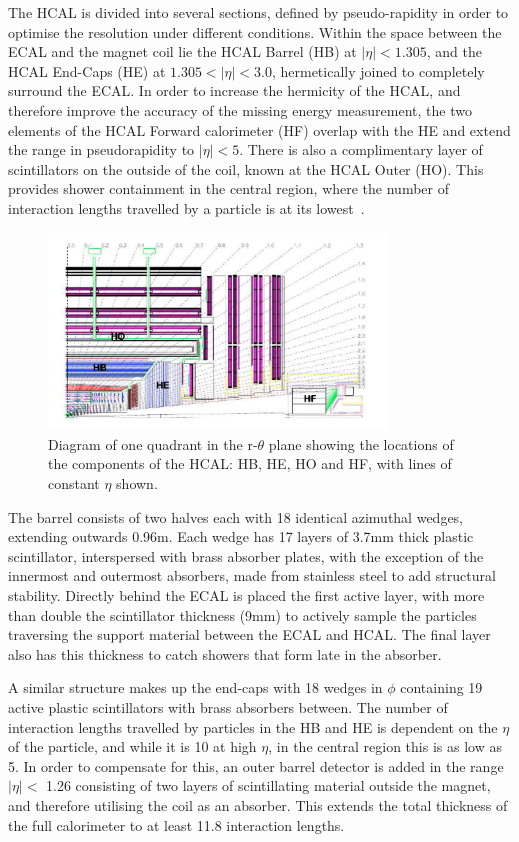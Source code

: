  The HCAL is divided into several sections, defined by pseudo-rapidity in order to optimise the resolution under different conditions. Within the space between the ECAL and the magnet coil lie the HCAL Barrel (HB) at $|\eta| < 1.305$, and the HCAL End-Caps (HE) at $1.305 < |\eta| < 3.0$, hermetically joined to completely surround the ECAL. In order to increase the hermicity of the HCAL, and therefore improve the accuracy of the missing energy measurement, the two elements of the HCAL Forward calorimeter (HF) overlap with the HE and extend the range in pseudorapidity to $|\eta|<5$. There is also a complimentary layer of scintillators on the outside of the coil, known at the HCAL Outer (HO).  This provides shower containment in the central region, where the number of interaction lengths travelled by a particle is at its lowest~\cite{HCALTDR}.


\begin{figure}
\centering
\includegraphics[width=0.8\textwidth]{Figures/Detector/HCAL}
\caption{Diagram of one quadrant in the r-$\theta$ plane showing the locations of the components of the HCAL: HB, HE, HO and HF, with lines of constant $\eta$ shown.}
\label{fig:HCAL}
\end{figure}


The barrel consists of two halves each with 18 identical azimuthal wedges, extending outwards 0.96m. Each wedge has 17 layers of 3.7mm thick plastic scintillator, interspersed with brass absorber plates, with the exception of the innermost and outermost absorbers, made from stainless steel to add structural stability. Directly behind the ECAL is placed the first active layer, with more than double the scintillator thickness (9mm) to actively sample the particles traversing the support material between the ECAL and HCAL. The final layer also has this thickness to catch showers that form late in the absorber. 

A similar structure makes up the end-caps with 18 wedges in $\phi$ containing 19 active plastic scintillators with brass absorbers between. The number of interaction lengths travelled by particles in the HB and HE is dependent on the $\eta$ of the particle, and while it is 10 at high $\eta$, in the central region this is as low as 5. In order to compensate for this, an outer barrel detector is added in the range $|\eta| <$ 1.26 consisting of two layers of scintillating material outside the magnet, and therefore utilising the coil as an absorber. This extends the total thickness of the full calorimeter to at least 11.8 interaction lengths. 

